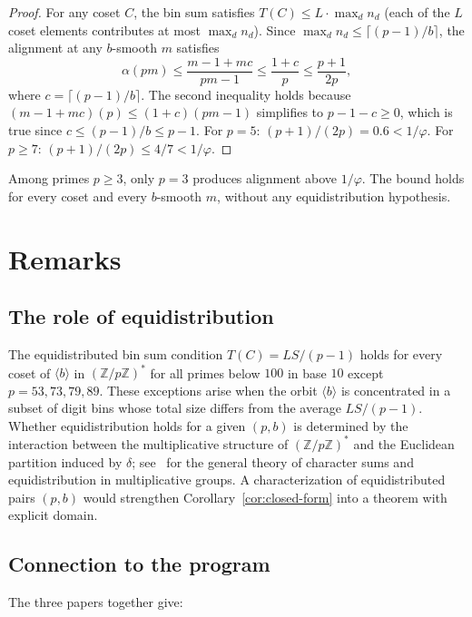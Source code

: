 \documentclass[12pt]{amsart}
\theoremstyle{definition}
\theoremstyle{remark}
\begin{document}
\begin{proof}
For any coset $C$, the bin sum satisfies $T(C) \le L \cdot
\max_d n_d$ (each of the $L$ coset elements contributes
at most $\max_d n_d$). Since
$\max_d n_d \le \lceil(p{-}1)/b\rceil$, the alignment
at any $b$-smooth $m$ satisfies
\[
\alpha(pm)
\le \frac{m{-}1 + m c}{pm - 1}
\le \frac{1 + c}{p}
\le \frac{p+1}{2p},
\]
where $c = \lceil(p{-}1)/b\rceil$. The second inequality
holds because $(m{-}1+mc)(p) \le (1+c)(pm{-}1)$
simplifies to $p - 1 - c \ge 0$, which is true since
$c \le (p{-}1)/b \le p{-}1$.
For $p = 5$: $(p{+}1)/(2p) = 0.6 < 1/\varphi$.
For $p \ge 7$: $(p{+}1)/(2p) \le 4/7 < 1/\varphi$.
\end{proof}

Among primes $p \ge 3$, only $p = 3$ produces alignment
above $1/\varphi$. The bound holds for every coset and
every $b$-smooth $m$, without any equidistribution
hypothesis.

\section{Remarks}

\subsection*{The role of equidistribution}

The equidistributed bin sum condition $T(C) = LS/(p{-}1)$
holds for every coset of $\langle b \rangle$ in
$(\mathbb{Z}/p\mathbb{Z})^{*}$ for all primes below $100$ in
base $10$ except $p = 53, 73, 79, 89$. These exceptions
arise when the orbit $\langle b \rangle$ is concentrated in
a subset of digit bins whose total size differs from the
average $LS/(p{-}1)$. Whether equidistribution holds for a
given $(p,b)$ is determined by the interaction between the
multiplicative structure of $(\mathbb{Z}/p\mathbb{Z})^{*}$
and the Euclidean partition induced by $\delta$;
see~\cite{iwaniec} for the general theory of character sums
and equidistribution in multiplicative groups. A
characterization of equidistributed pairs $(p,b)$ would
strengthen Corollary~\ref{cor:closed-form} into a theorem
with explicit domain.

\subsection*{Connection to the program}

The three papers together give:
\end{document}
